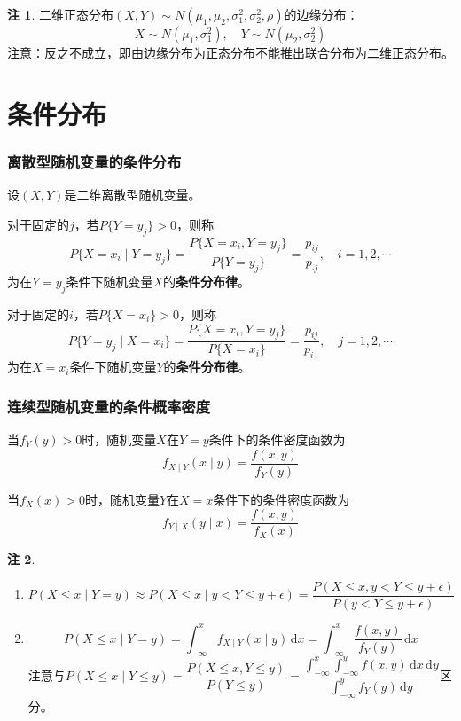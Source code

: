 \documentclass[11pt,a4paper]{report}
\theoremstyle{definition}
\newtheorem{remark}{注}[chapter]
\theoremstyle{plain}
\begin{document}
\begin{remark}
二维正态分布\((X,Y)\sim N(\mu_1,\mu_2,\sigma_1^2,\sigma_2^2,\rho)\)的边缘分布：
\[
X\sim N(\mu_1,\sigma_1^2),\quad Y\sim N(\mu_2,\sigma_2^2)
\]
注意：反之不成立，即由边缘分布为正态分布不能推出联合分布为二维正态分布。
\end{remark}

\section{条件分布}

\subsubsection{离散型随机变量的条件分布}

设\((X,Y)\)是二维离散型随机变量。

对于固定的\(j\)，若\(P\{Y=y_j\}>0\)，则称
\[
P\{X=x_i\mid Y=y_j\}=\frac{P\{X=x_i,Y=y_j\}}{P\{Y=y_j\}}=\frac{p_{ij}}{p_{\cdot j}},\quad i=1,2,\cdots
\]
为在\(Y=y_j\)条件下随机变量\(X\)的\textbf{条件分布律}。

对于固定的\(i\)，若\(P\{X=x_i\}>0\)，则称
\[
P\{Y=y_j\mid X=x_i\}=\frac{P\{X=x_i,Y=y_j\}}{P\{X=x_i\}}=\frac{p_{ij}}{p_{i\cdot}},\quad j=1,2,\cdots
\]
为在\(X=x_i\)条件下随机变量\(Y\)的\textbf{条件分布律}。

\subsubsection{连续型随机变量的条件概率密度}

当\(f_Y(y)>0\)时，随机变量\(X\)在\(Y=y\)条件下的条件密度函数为
\[
f_{X\mid Y}(x\mid y)=\frac{f(x,y)}{f_Y(y)}
\]

当\(f_X(x)>0\)时，随机变量\(Y\)在\(X=x\)条件下的条件密度函数为
\[
f_{Y\mid X}(y\mid x)=\frac{f(x,y)}{f_X(x)}
\]

\begin{remark}
\begin{enumerate}[label=\arabic*.,leftmargin=2em]
    \item
    \[
    P(X\leq x\mid Y=y)\approx P(X\leq x\mid y<Y\leq y+\epsilon)=\frac{P(X\leq x,y<Y\leq y+\epsilon)}{P(y<Y\leq y+\epsilon)}
    \]
    \item
    \[
    P(X\leq x\mid Y=y)=\int_{-\infty}^{x}f_{X\mid Y}(x\mid y)\,\mathrm{d}x=\int_{-\infty}^{x}\frac{f(x,y)}{f_Y(y)}\,\mathrm{d}x
    \]
    注意与\(P(X\leq x\mid Y\leq y)=\dfrac{P(X\leq x,Y\leq y)}{P(Y\leq y)}=\dfrac{\displaystyle\int_{-\infty}^{x}\int_{-\infty}^{y}f(x,y)\,\mathrm{d}x\,\mathrm{d}y}{\displaystyle\int_{-\infty}^{y}f_Y(y)\,\mathrm{d}y}\)区分。
\end{enumerate}
\end{remark}
\end{document}
